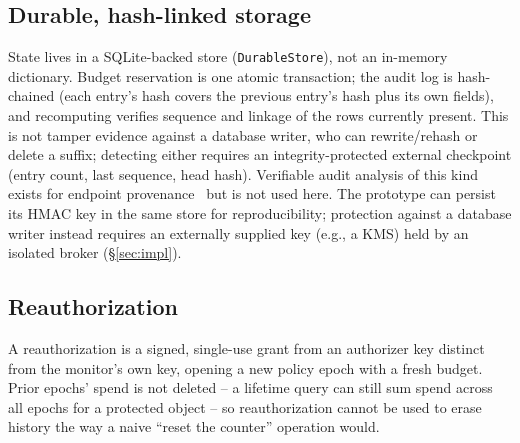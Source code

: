 \documentclass[conference,compsoc]{IEEEtran}
\newcommand{\rev}[1]{#1} %
\begin{document}
\subsection{Durable, hash-linked storage}
State lives in a SQLite-backed store (\texttt{DurableStore}), not an
in-memory dictionary. Budget reservation is one atomic transaction; the
audit log is hash-chained (each entry's hash covers the previous
entry's hash plus its own fields), and recomputing verifies sequence
and linkage of the rows currently present. This is not tamper evidence
against a database writer, who can rewrite/rehash or delete a suffix;
detecting either requires an integrity-protected external checkpoint
(entry count, last sequence, head hash). \rev{Verifiable audit analysis of this kind exists for endpoint provenance~\cite{vcause2026} but is not used here.} The prototype can persist its
HMAC key in the same store for reproducibility; protection against a
database writer instead requires an externally supplied key (e.g., a
KMS) held by an isolated broker (\S\ref{sec:impl}).

\subsection{Reauthorization}
A reauthorization is a signed, single-use grant from an authorizer key
distinct from the monitor's own key, opening a new policy epoch with a
fresh budget. Prior epochs' spend is not deleted -- a lifetime query can
still sum spend across all epochs for a protected object -- so
reauthorization cannot be used to erase history the way a naive
``reset the counter'' operation would.
\end{document}
